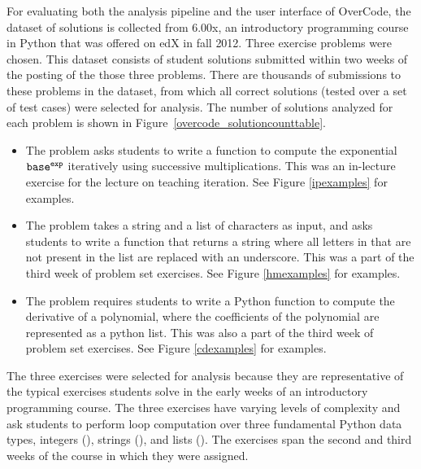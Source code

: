 For evaluating both the analysis pipeline and the user interface of OverCode, the dataset of solutions is collected from 6.00x, an introductory programming course in Python that was offered on edX in fall 2012. Three exercise problems were chosen. This dataset consists of student solutions submitted within two weeks of the posting of the those three problems. There are thousands of submissions to these problems in the dataset, from which all correct solutions (tested over a set of test cases) were selected for analysis. The number of solutions analyzed for each problem is shown in Figure~\ref{overcode_solutioncounttable}.




\begin{itemize}
\item {\bf {}} The  problem asks students to write a function to compute the exponential $\texttt{base}^{\texttt{exp}}$ iteratively using successive multiplications. This was an in-lecture exercise for the lecture on teaching iteration. See Figure \ref{ipexamples} for examples.
\item {\bf {}} The  problem takes a string  and a list of characters  as input, and asks students to write a function that returns a string where all letters in  that are not present in the list  are replaced with an underscore. This was a part of the third week of problem set exercises. See Figure \ref{hmexamples} for examples.
\item {\bf {}} The  problem requires students to write a Python function to compute the derivative of a polynomial, where the coefficients of the polynomial are represented as a python list. This was also a part of the third week of problem set exercises. See Figure \ref{cdexamples} for examples.
\end{itemize}

The three exercises were selected for analysis because they are representative of the typical exercises students solve in the early weeks of an introductory programming course. The three exercises have varying levels of complexity and ask students to perform loop computation over three fundamental Python data types, integers (), strings (), and lists (). The exercises span the second and third weeks of the course in which they were assigned.

